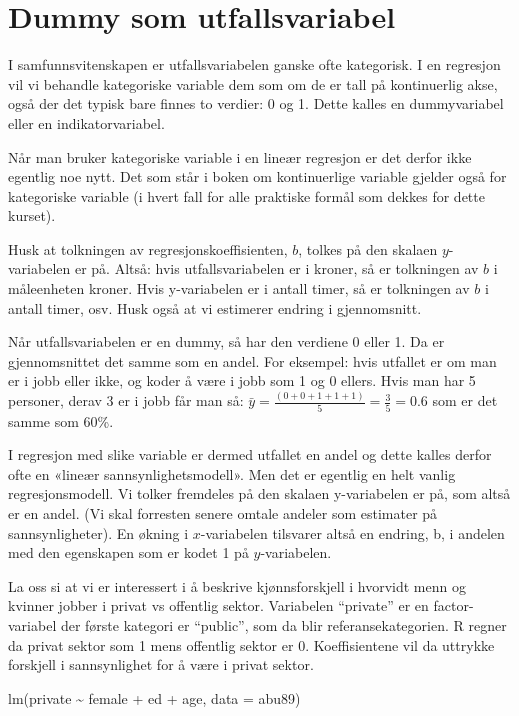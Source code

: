 \documentclass[
  letterpaper,
  DIV=11,
  numbers=noendperiod]{scrreprt}
\newenvironment{Shaded}{\begin{snugshade}}{\end{snugshade}}
\newcommand{\AttributeTok}[1]{\textcolor[rgb]{0.40,0.45,0.13}{#1}}
\newcommand{\FunctionTok}[1]{\textcolor[rgb]{0.28,0.35,0.67}{#1}}
\newcommand{\NormalTok}[1]{\textcolor[rgb]{0.00,0.23,0.31}{#1}}
\newcommand{\SpecialCharTok}[1]{\textcolor[rgb]{0.37,0.37,0.37}{#1}}
\theoremstyle{definition}
\theoremstyle{remark}
\begin{document}
\hypertarget{dummy-som-utfallsvariabel}{%
\section{Dummy som utfallsvariabel}\label{dummy-som-utfallsvariabel}}

I samfunnsvitenskapen er utfallsvariabelen ganske ofte kategorisk. I en
regresjon vil vi behandle kategoriske variable dem som om de er tall på
kontinuerlig akse, også der det typisk bare finnes to verdier: 0 og 1.
Dette kalles en dummyvariabel eller en indikatorvariabel.

Når man bruker kategoriske variable i en lineær regresjon er det derfor
ikke egentlig noe nytt. Det som står i boken om kontinuerlige variable
gjelder også for kategoriske variable (i hvert fall for alle praktiske
formål som dekkes for dette kurset).

Husk at tolkningen av regresjonskoeffisienten, \(b\), tolkes på den
skalaen \(y\)-variabelen er på. Altså: hvis utfallsvariabelen er i
kroner, så er tolkningen av \(b\) i måleenheten kroner. Hvis
y-variabelen er i antall timer, så er tolkningen av \(b\) i antall
timer, osv. Husk også at vi estimerer endring i gjennomsnitt.

Når utfallsvariabelen er en dummy, så har den verdiene 0 eller 1. Da er
gjennomsnittet det samme som en andel. For eksempel: hvis utfallet er om
man er i jobb eller ikke, og koder å være i jobb som 1 og 0 ellers. Hvis
man har 5 personer, derav 3 er i jobb får man så:
\(\bar{y} = \frac{(0+0+1+1+1)} {5} = \frac{3}{5}=0.6\) som er det samme
som 60\%.

I regresjon med slike variable er dermed utfallet en andel og dette
kalles derfor ofte en «lineær sannsynlighetsmodell». Men det er egentlig
en helt vanlig regresjonsmodell. Vi tolker fremdeles på den skalaen
y-variabelen er på, som altså er en andel. (Vi skal forresten senere
omtale andeler som estimater på sannsynligheter). En økning i
\(x\)-variabelen tilsvarer altså en endring, b, i andelen med den
egenskapen som er kodet 1 på \(y\)-variabelen.

La oss si at vi er interessert i å beskrive kjønnsforskjell i hvorvidt
menn og kvinner jobber i privat vs offentlig sektor. Variabelen
``private'' er en factor-variabel der første kategori er ``public'', som
da blir referansekategorien. R regner da privat sektor som 1 mens
offentlig sektor er 0. Koeffisientene vil da uttrykke forskjell i
sannsynlighet for å være i privat sektor.

\begin{Shaded}
\begin{Highlighting}[]
\FunctionTok{lm}\NormalTok{(private }\SpecialCharTok{\textasciitilde{}}\NormalTok{ female }\SpecialCharTok{+}\NormalTok{ ed }\SpecialCharTok{+}\NormalTok{ age, }\AttributeTok{data =}\NormalTok{ abu89)}
\end{Highlighting}
\end{Shaded}
\end{document}
